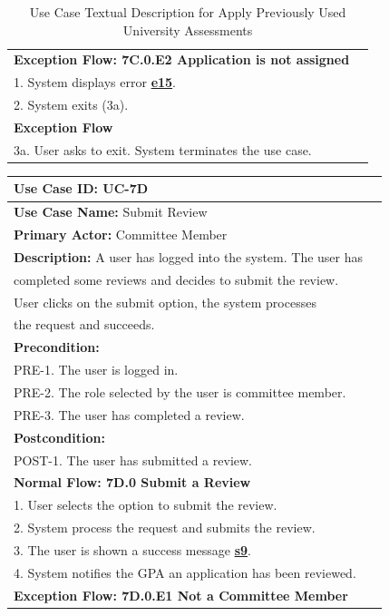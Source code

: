 \documentclass[fontsize=12pt,paper=letter,twoside]{scrartcl}
\begin{document}
\begin{table}[!htb]
\begin{center}
\begin{tabular}{|l|l|}
\textbf{Exception Flow: 7C.0.E2 Application is not assigned}
\\ 1. System displays error \hyperref[app:error]{\textbf{e15}}.
\\ 2. System exits (3a). \\ \hline
\textbf{Exception Flow}
\\ 3a. User asks to exit. System terminates the use case.\\ \hline
\end{tabular}
\end{center}
\caption {Use Case Textual Description for Apply Previously Used University Assessments}
\label{tbl:uc7Ctd}
\end{table}

\begin{table}[!htb]
\begin{center}
\begin{tabular}{|l|l|}
\hline
\textbf{Use Case ID:} UC-7D \\ \hline
\textbf{Use Case Name:} Submit Review \\ \hline
\textbf {Primary Actor:} Committee Member \\ \hline
\textbf{Description:} A user has logged into the system. The user has \\completed some reviews and decides to submit the review. \\User clicks on the submit option, the system processes \\the request and succeeds.\\ \hline
\textbf{Precondition:}
\\ PRE-1. The user is logged in.
\\ PRE-2. The role selected by the user is committee member.
\\ PRE-3. The user has completed a review.\\ \hline
\textbf{Postcondition:}
\\ POST-1. The user has submitted a review. \\ \hline
\textbf{Normal Flow: 7D.0 Submit a Review}
\\ 1. User selects the option to submit the review.
\\ 2. System process the request and submits the review.
\\ 3. The user is shown a success message \hyperref[app:success]{\textbf{s9}}. 
\\ 4. System notifies the GPA an application has been reviewed. \\ \hline
\textbf{Exception Flow: 7D.0.E1 Not a Committee Member}

\end{tabular}
\end{center}
\end{table}
\end{document}
